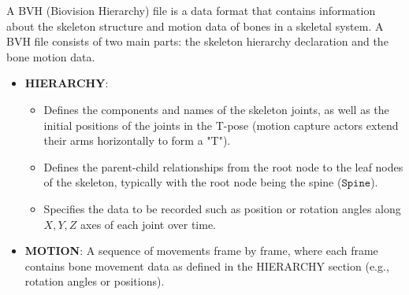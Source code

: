 A BVH (Biovision Hierarchy) file is a data format that contains information about the skeleton structure and motion data of bones in a skeletal system. A BVH file consists of two main parts: the skeleton hierarchy declaration and the bone motion data.

\begin{itemize}
	\item \textbf{HIERARCHY}:
	
	\begin{itemize}
		\item Defines the components and names of the skeleton joints, as well as the initial positions of the joints in the T-pose (motion capture actors extend their arms horizontally to form a "T").
		\item Defines the parent-child relationships from the root node to the leaf nodes of the skeleton, typically with the root node being the spine ($\texttt{Spine}$).
		\item Specifies the data to be recorded such as position or rotation angles along $X, Y, Z$ axes of each joint over time.
	\end{itemize}
	
	\item \textbf{MOTION}: A sequence of movements frame by frame, where each frame contains bone movement data as defined in the HIERARCHY section (e.g., rotation angles or positions).
\end{itemize}

